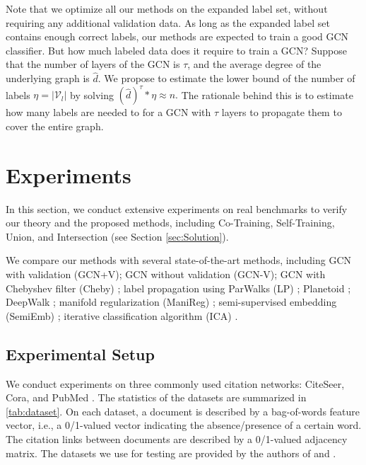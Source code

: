\documentclass[letterpaper]{article} \usepackage{aaai18}  \usepackage{times}  \usepackage{helvet}  \usepackage{courier}  \usepackage{url}  \usepackage{graphicx}  \usepackage{algorithm}
\begin{document}
Note that we optimize all our methods on the expanded label set, without requiring any additional validation data. As long as the expanded label set contains enough correct labels, our methods are expected to train a good GCN classifier. But how much labeled data does it require to train a GCN? Suppose that the number of layers of the GCN is $\tau$, and the average degree of the underlying graph is $\hat{d}$. We propose to estimate the lower bound of the number of labels $\eta=|\mathcal{V}_l|$ by solving  $(\hat{d})^{\tau}*\eta \approx n.$ The rationale behind this is to estimate how many labels are needed to for a GCN with $\tau$ layers to propagate them to cover the entire graph.














\section{Experiments}\label{sec:Experiment}

In this section, we conduct extensive experiments on real benchmarks to verify our theory and the proposed methods, including Co-Training, Self-Training, Union, and Intersection (see Section \ref{sec:Solution}).








We compare our methods with several state-of-the-art methods, including
GCN with validation (GCN+V); GCN without validation (GCN-V); GCN with Chebyshev filter (Cheby) \cite{kipf2016semi}; label propagation using ParWalks (LP) \cite{Wu12parw}; Planetoid \cite{yang2016revisiting}; DeepWalk \cite{perozzi2014deepwalk}; manifold regularization (ManiReg) \cite{belkin2006manifold}; semi-supervised embedding (SemiEmb) \cite{weston2012deep}; iterative classification algorithm (ICA) \cite{sen2008collective}.

\subsection{Experimental Setup}

We conduct experiments on three commonly used citation networks: CiteSeer, Cora, and PubMed \cite{sen2008collective}. The statistics of the datasets are summarized in \tablename\;\ref{tab:dataset}. On each dataset, a document is described by a bag-of-words feature vector, i.e., a 0/1-valued vector indicating the absence/presence of a certain word. The citation links between documents are described by a 0/1-valued adjacency matrix. The datasets we use for testing are provided by the authors of \cite{yang2016revisiting} and \cite{kipf2016semi}.
\end{document}
